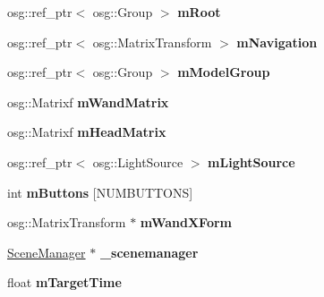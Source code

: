 \begin{DoxyCompactItemize}
\item 
\hypertarget{class_v_r_builder_app_abd0115f9b56ec2254534081464382544}{
osg::ref\_\-ptr$<$ osg::Group $>$ {\bfseries mRoot}}
\label{class_v_r_builder_app_abd0115f9b56ec2254534081464382544}

\item 
\hypertarget{class_v_r_builder_app_a5e6a5af7b4125c5295b74d5782680e1d}{
osg::ref\_\-ptr$<$ osg::MatrixTransform $>$ {\bfseries mNavigation}}
\label{class_v_r_builder_app_a5e6a5af7b4125c5295b74d5782680e1d}

\item 
\hypertarget{class_v_r_builder_app_a0923b127900ca055371269d2bd711fd9}{
osg::ref\_\-ptr$<$ osg::Group $>$ {\bfseries mModelGroup}}
\label{class_v_r_builder_app_a0923b127900ca055371269d2bd711fd9}

\item 
\hypertarget{class_v_r_builder_app_a768effa6fe58ab060f8fd33d3d946ec0}{
osg::Matrixf {\bfseries mWandMatrix}}
\label{class_v_r_builder_app_a768effa6fe58ab060f8fd33d3d946ec0}

\item 
\hypertarget{class_v_r_builder_app_af8e87e8319e2fdcff8ae936855ea0fa8}{
osg::Matrixf {\bfseries mHeadMatrix}}
\label{class_v_r_builder_app_af8e87e8319e2fdcff8ae936855ea0fa8}

\item 
\hypertarget{class_v_r_builder_app_afb81e17988802983720979841a5d44c2}{
osg::ref\_\-ptr$<$ osg::LightSource $>$ {\bfseries mLightSource}}
\label{class_v_r_builder_app_afb81e17988802983720979841a5d44c2}

\item 
\hypertarget{class_v_r_builder_app_a56e73a52b58e36b544c4bbb4ab242f2f}{
int {\bfseries mButtons} \mbox{[}NUMBUTTONS\mbox{]}}
\label{class_v_r_builder_app_a56e73a52b58e36b544c4bbb4ab242f2f}

\item 
\hypertarget{class_v_r_builder_app_a319da0184f5cecb1b178a076b883bf59}{
osg::MatrixTransform $\ast$ {\bfseries mWandXForm}}
\label{class_v_r_builder_app_a319da0184f5cecb1b178a076b883bf59}

\item 
\hypertarget{class_v_r_builder_app_abf6666f32f67ff4b6606948355590fcb}{
\hyperlink{class_scene_manager}{SceneManager} $\ast$ {\bfseries \_\-scenemanager}}
\label{class_v_r_builder_app_abf6666f32f67ff4b6606948355590fcb}

\item 
\hypertarget{class_v_r_builder_app_a2e43e7eebb5aa2659dd86f55a25e1e31}{
float {\bfseries mTargetTime}}
\label{class_v_r_builder_app_a2e43e7eebb5aa2659dd86f55a25e1e31}


\end{DoxyCompactItemize}
